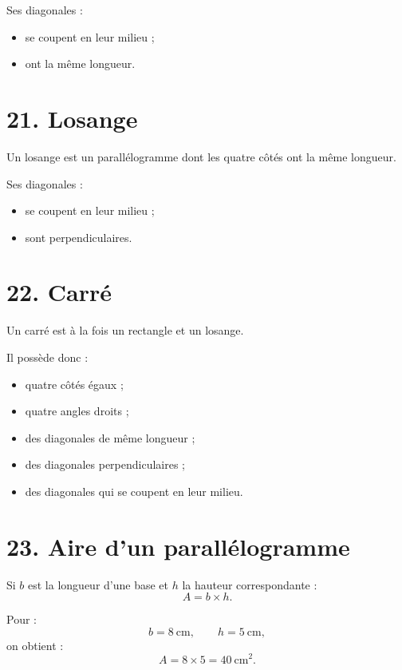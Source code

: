 Ses diagonales :
\begin{itemize}
\item se coupent en leur milieu ;
\item ont la même longueur.
\end{itemize}

\section{21. Losange}

\begin{definition}
Un losange est un parallélogramme dont les quatre côtés ont la même longueur.
\end{definition}

Ses diagonales :
\begin{itemize}
\item se coupent en leur milieu ;
\item sont perpendiculaires.
\end{itemize}

\section{22. Carré}

\begin{definition}
Un carré est à la fois un rectangle et un losange.
\end{definition}

Il possède donc :
\begin{itemize}
\item quatre côtés égaux ;
\item quatre angles droits ;
\item des diagonales de même longueur ;
\item des diagonales perpendiculaires ;
\item des diagonales qui se coupent en leur milieu.
\end{itemize}

\section{23. Aire d'un parallélogramme}

Si $b$ est la longueur d'une base et $h$ la hauteur correspondante :
\[
\boxed{A=b\times h}.
\]

\begin{exemple}
Pour :
\[
b=8\ \text{cm},
\qquad
h=5\ \text{cm},
\]
on obtient :
\[
A=8\times5=40\ \text{cm}^2.
\]
\end{exemple}

